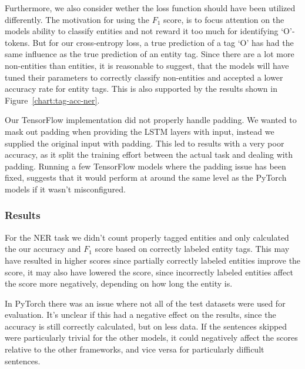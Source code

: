 Furthermore, we also consider wether the loss function should have been utilized
differently. The motivation for using the $F_{1}$ score, is to focus attention
on the models ability to classify entities and not reward it too much for
identifying `O'-tokens. But for our cross-entropy loss, a true prediction of a
tag `O' has had the same influence as the true prediction of an entity tag.
Since there are a lot more non-entities than entities, it is reasonable to
suggest, that the models will have tuned their parameters to correctly classify
non-entities and accepted a lower accuracy rate for entity tags. This is also
supported by the results shown in Figure~\ref{chart:tag-acc-ner}.

Our TensorFlow implementation did not properly handle padding. We wanted to mask
out padding when providing the LSTM layers with input, instead we supplied the
original input with padding. This led to results with a very poor
accuracy, as it split the training effort between the actual task and dealing
with padding. Running a few TensorFlow models where the padding issue has been
fixed, suggests that it would perform at around the same level as the PyTorch
models if it wasn't misconfigured.

\subsubsection{Results}

For the NER task we didn't count properly tagged entities and only calculated
the our accuracy and $F_1$ score based on correctly labeled entity tags. This
may have resulted in higher scores since partially correctly labeled entities
improve the score, it may also have lowered the score, since incorrectly labeled
entities affect the score more negatively, depending on how long the entity is. 

In PyTorch there was an issue where not all of the test datasets were used for
evaluation. It's unclear if this had a negative effect on the results, since the
accuracy is still correctly calculated, but on less data. If the sentences
skipped were particularly trivial for the other models, it could negatively
affect the scores relative to the other frameworks, and vice versa for
particularly difficult sentences.



